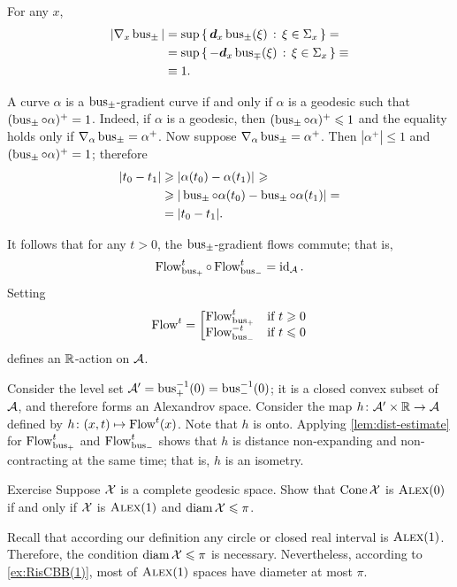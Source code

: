 For any $x$,
\begin{align*}
|\nabla_x \bus_\pm|
&=\sup\set{\dd_x\bus_\pm(\xi)}{\xi\in\Sigma_x}=
\\
&=\sup\set{-\dd_x\bus_\mp(\xi)}{\xi\in\Sigma_x}\equiv
\\
&\equiv1.
\end{align*}

A curve $\alpha$ is a $\bus_\pm$-gradient curve
if and only if $\alpha$ is a geodesic such that $(\bus_\pm\circ\alpha)^+=1$.
Indeed, if $\alpha$ is a geodesic, then $(\bus_\pm\circ\alpha)^+\le 1$ and the equality holds only if $\nabla_\alpha\bus_\pm=\alpha^+$.
Now suppose $\nabla_\alpha\bus_\pm\z=\alpha^+$.
Then $|\alpha^+|\le 1$ and $(\bus_\pm\circ\alpha)^+=1$; therefore 
\begin{align*}
|t_0-t_1|&\ge \dist{\alpha(t_0)}{\alpha(t_1)}{}\ge
\\
&\ge|\bus_\pm\circ\alpha(t_0)-\bus_\pm\circ\alpha(t_1)|=
\\
&=|t_0-t_1|.
\end{align*}

It follows that for any $t>0$, the $\bus_\pm$-gradient flows commute;
that is, 
\[\GF_{\bus_+}^t\circ\GF_{\bus_-}^t=\id_\spc{A}.\]
Setting
\[\GF^t=\left[\begin{matrix}
\GF_{\bus_+}^t&\hbox{if}\ t\ge0\\
\GF_{\bus_-}^{-t}&\hbox{if}\ t\le0
               \end{matrix}\right.\]
defines an $\RR$-action on $\spc{A}$.

Consider the level set $\spc{A}'=\bus_+^{-1}(0)=\bus_-^{-1}(0)$;
it is a closed convex subset of $\spc{A}$, and therefore forms an Alexandrov space.
Consider the map $h\:\spc{A}'\times \RR\to \spc{A}$ defined by $h\:(x,t)\mapsto \GF^t(x)$.
Note that $h$ is onto.
Applying \ref{lem:dist-estimate} for $\GF_{\bus_+}^t$ and $\GF_{\bus_-}^t$ shows that $h$ is distance non-expanding and non-contracting at the same time; that is, $h$ is an isometry.
\qeds

\begin{thm}{Exercise}\label{ex:cone-CBB}
Suppose $\spc{X}$ is a complete geodesic space.
Show that $\Cone\spc{X}$ is $\Alex0$ if and only if $\spc{X}$ is $\Alex1$ and $\diam\spc{X}\le \pi$.
\end{thm}

Recall that according our definition any circle or closed real interval is $\Alex1$.
Therefore, the condition $\diam\spc{X}\le \pi$ is necessary.
Nevertheless, according to \ref{ex:RisCBB(1)}, most of $\Alex1$ spaces have diameter at most $\pi$.

